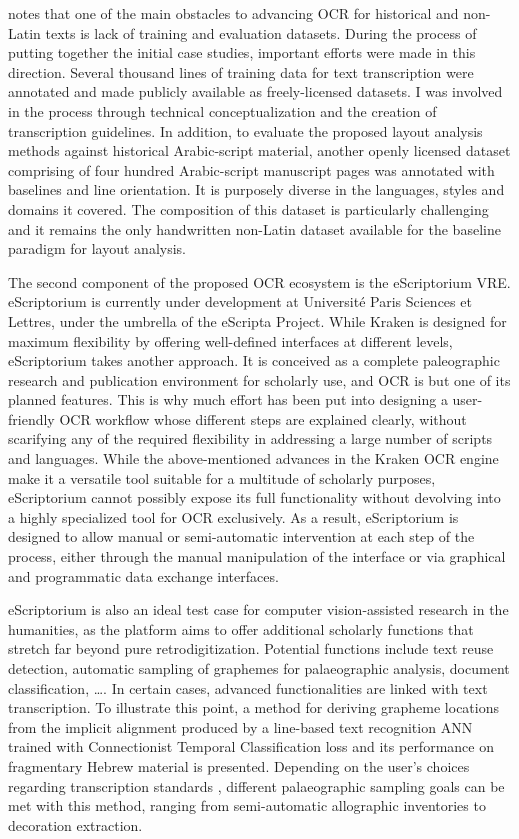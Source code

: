 \cite[pg. 19]{smith2018research} notes that one of the main obstacles to
advancing OCR for historical and non-Latin texts is lack of training and
evaluation datasets. During the process of putting together the initial case
studies, important efforts were made in this direction. Several thousand lines
of training data for text transcription were annotated and made publicly
available as freely-licensed datasets. I was involved in the process through
technical conceptualization and the creation of transcription guidelines. In
addition, to evaluate the proposed layout analysis methods against historical
Arabic-script material, another openly licensed dataset comprising of four
hundred Arabic-script manuscript pages was annotated with baselines and line
orientation. It is purposely diverse in the languages, styles and domains it
covered. The composition of this dataset is particularly challenging and it
remains the only handwritten non-Latin dataset available for the baseline
paradigm for layout analysis.

The second component of the proposed OCR ecosystem is the eScriptorium VRE.
eScriptorium is currently under development at Université Paris Sciences et
Lettres, under the umbrella of the eScripta Project. While Kraken is designed
for maximum flexibility by offering well-defined interfaces at different
levels, eScriptorium takes another approach. It is conceived as a complete
paleographic research and publication environment for scholarly use, and OCR is
but one of its planned features. This is why much effort has been put into
designing a user-friendly OCR workflow whose different steps are explained
clearly, without scarifying any of the required flexibility in addressing a
large number of scripts and languages.  While the above-mentioned advances in
the Kraken OCR engine make it a versatile tool suitable for a multitude of
scholarly purposes, eScriptorium cannot possibly expose its full functionality
without devolving into a highly specialized tool for OCR exclusively.  As a
result, eScriptorium is designed to allow manual or semi-automatic intervention
at each step of the process, either through the manual manipulation of the
interface or via graphical and programmatic data exchange interfaces.

eScriptorium is also an ideal test case for computer vision-assisted research
in the humanities, as the platform aims to offer additional scholarly functions that
stretch far beyond pure retrodigitization. Potential functions include text
reuse detection, automatic sampling of graphemes for palaeographic analysis,
document classification, \dots. In certain cases, advanced functionalities are
linked with text transcription. To illustrate this point, a method for
deriving grapheme locations from the implicit alignment produced by a
line-based text recognition ANN trained with Connectionist Temporal
Classification loss and its performance on fragmentary Hebrew  material is
presented. Depending on the user’s choices regarding transcription standards ,
different palaeographic sampling goals can be met with this method, ranging
from semi-automatic allographic inventories to decoration extraction.

